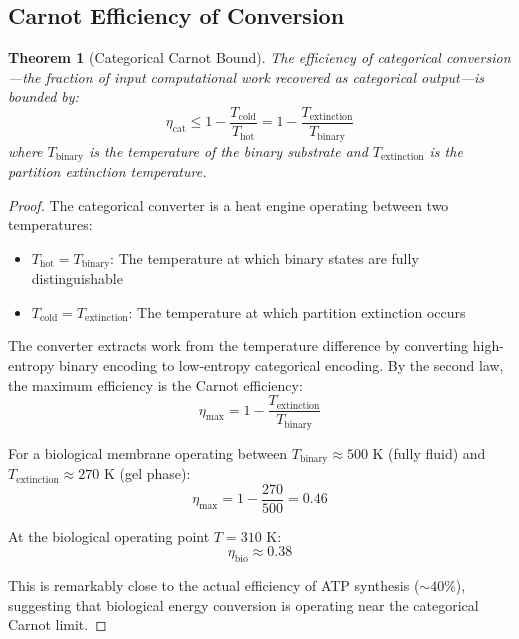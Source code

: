 \documentclass[twocolumn,10pt]{article}
\newtheorem{theorem}{Theorem}[section]
\theoremstyle{remark}
\begin{document}
\subsection{Carnot Efficiency of Conversion}

\begin{theorem}[Categorical Carnot Bound]
\label{thm:carnot}
The efficiency of categorical conversion---the fraction of input computational work recovered as categorical output---is bounded by:
\begin{equation}
    \eta_{\text{cat}} \leq 1 - \frac{T_{\text{cold}}}{T_{\text{hot}}} = 1 - \frac{T_{\text{extinction}}}{T_{\text{binary}}}
\end{equation}
where $T_{\text{binary}}$ is the temperature of the binary substrate and $T_{\text{extinction}}$ is the partition extinction temperature.
\end{theorem}

\begin{proof}
The categorical converter is a heat engine operating between two temperatures:
\begin{itemize}
    \item $T_{\text{hot}} = T_{\text{binary}}$: The temperature at which binary states are fully distinguishable
    \item $T_{\text{cold}} = T_{\text{extinction}}$: The temperature at which partition extinction occurs
\end{itemize}

The converter extracts work from the temperature difference by converting high-entropy binary encoding to low-entropy categorical encoding. By the second law, the maximum efficiency is the Carnot efficiency:
\begin{equation}
    \eta_{\max} = 1 - \frac{T_{\text{extinction}}}{T_{\text{binary}}}
\end{equation}

For a biological membrane operating between $T_{\text{binary}} \approx 500$ K (fully fluid) and $T_{\text{extinction}} \approx 270$ K (gel phase):
\begin{equation}
    \eta_{\max} = 1 - \frac{270}{500} = 0.46
\end{equation}

At the biological operating point $T = 310$ K:
\begin{equation}
    \eta_{\text{bio}} \approx 0.38
\end{equation}

This is remarkably close to the actual efficiency of ATP synthesis ($\sim 40\%$), suggesting that biological energy conversion is operating near the categorical Carnot limit.
\end{proof}
\end{document}
